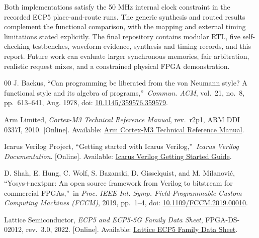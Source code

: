 \documentclass[conference]{IEEEtran}
\begin{document}
Both implementations satisfy the 50 MHz internal clock constraint in the recorded ECP5 place-and-route runs. The generic synthesis and routed results complement the functional comparison, with the mapping and external timing limitations stated explicitly. The final repository contains modular RTL, five self-checking testbenches, waveform evidence, synthesis and timing records, and this report. Future work can evaluate larger synchronous memories, fair arbitration, realistic request mixes, and a constrained physical FPGA demonstration.

\begin{thebibliography}{00}
J. Backus, \textquotedblleft Can programming be liberated from the von Neumann style? A functional style and its algebra of programs,\textquotedblright\ \emph{Commun. ACM}, vol.~21, no.~8, pp.~613--641, Aug. 1978, doi: \href{https://doi.org/10.1145/359576.359579}{10.1145/359576.359579}.

Arm Limited, \emph{Cortex-M3 Technical Reference Manual}, rev.~r2p1, ARM DDI 0337I, 2010. [Online]. Available: \href{https://www.keil.com/dd/docs/datashts/arm/cortex_m3/r2p1/ddi0337i_cortexm3_r2p1_trm.pdf}{Arm Cortex-M3 Technical Reference Manual}.

Icarus Verilog Project, \textquotedblleft Getting started with Icarus Verilog,\textquotedblright\ \emph{Icarus Verilog Documentation}. [Online]. Available: \href{https://steveicarus.github.io/iverilog/usage/getting_started.html}{Icarus Verilog Getting Started Guide}.

D. Shah, E. Hung, C. Wolf, S. Bazanski, D. Gisselquist, and M. Milanovi\'{c}, \textquotedblleft Yosys+nextpnr: An open source framework from Verilog to bitstream for commercial FPGAs,\textquotedblright\ in \emph{Proc. IEEE Int. Symp. Field-Programmable Custom Computing Machines (FCCM)}, 2019, pp.~1--4, doi: \href{https://doi.org/10.1109/FCCM.2019.00010}{10.1109/FCCM.2019.00010}.

Lattice Semiconductor, \emph{ECP5 and ECP5-5G Family Data Sheet}, FPGA-DS-02012, rev.~3.0, 2022. [Online]. Available: \href{https://www.latticesemi.com/-/media/LatticeSemi/Documents/DataSheets/ECP5/FPGA-DS-02012-3-0-ECP5-ECP5G-Family-Data-Sheet.ashx?document_id=50461}{Lattice ECP5 Family Data Sheet}.
\end{thebibliography}
\end{document}
